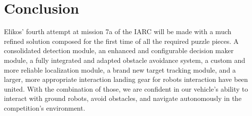 \section*{Conclusion}

Elikos’ fourth attempt at mission 7a of the IARC will be made with a much refined solution composed for the first time of all the required puzzle pieces. A consolidated detection module, an enhanced and configurable decision maker module, a fully integrated and adapted obstacle avoidance system, a custom and more reliable localization module, a brand new target tracking module, and a larger, more appropriate interaction landing gear for robots interaction have been united. With the combination of those, we are confident in our vehicle’s ability to interact with ground robots, avoid obstacles, and navigate autonomously in the competition’s environment.

